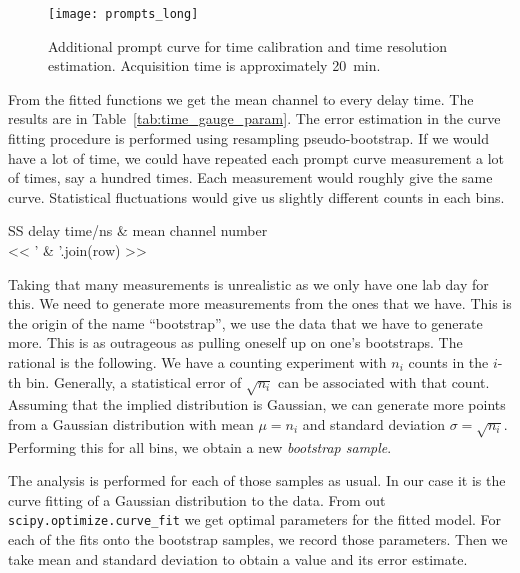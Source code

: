 \documentclass[11pt, english, fleqn, DIV=15, headinclude, BCOR=2cm]{scrreprt}
\begin{document}
\begin{figure}
    \centering
    \texttt{[image: prompts\_long]}
    \caption{%
        Additional prompt curve for time calibration and time
        resolution estimation. Acquisition time is approximately
        \SI{20}{\minute}.
    }
    \label{fig:prompts_long}
\end{figure}

From the fitted functions we get the mean channel to every delay time. The
results are in Table~\ref{tab:time_gauge_param}. The error estimation in the
curve fitting procedure is performed using resampling pseudo-bootstrap. If we
would have a lot of time, we could have repeated each prompt curve measurement
a lot of times, say a hundred times. Each measurement would roughly give the
same curve. Statistical fluctuations would give us slightly different counts in
each bins.

\begin{table}
        \centering
        \begin{tabular}{SS}
                \toprule
                {delay time/\si{\nano\second}}
                & {mean channel number} \\
                \midrule
                << ' & '.join(row) >> \\
                \bottomrule
        \end{tabular}
        \caption{%
                Mean channel number of Gauss fit width corresponding delay
                times.
        }
        \label{tab:time_gauge_param}
\end{table}

Taking that many measurements is unrealistic as we only have one lab day for
this. We need to generate more measurements from the ones that we have. This is
the origin of the name \enquote{bootstrap}, we use the data that we have to
generate more. This is as outrageous as pulling oneself up on one's bootstraps.
The rational is the following. We have a counting experiment with $n_i$ counts
in the $i$-th bin. Generally, a statistical error of $\sqrt{n_i}$ can be
associated with that count. Assuming that the implied distribution is Gaussian,
we can generate more points from a Gaussian distribution with mean $\mu = n_i$
and standard deviation $\sigma = \sqrt{n_i}$. Performing this for all bins, we
obtain a new \emph{bootstrap sample}.

The analysis is performed for each of those samples as usual. In our case it is
the curve fitting of a Gaussian distribution to the data. From out
\texttt{scipy.optimize.curve\_fit} we get optimal parameters for the fitted
model. For each of the fits onto the bootstrap samples, we record those
parameters. Then we take mean and standard deviation to obtain a value and its
error estimate.
\end{document}
